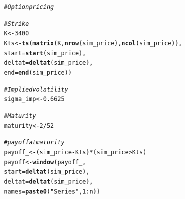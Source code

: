 \documentclass[a4paper]{article}\usepackage[]{graphicx}\usepackage[]{color}
\makeatletter
\newcommand{\hlnum}[1]{\textcolor[rgb]{0.686,0.059,0.569}{#1}}%
\newcommand{\hlstr}[1]{\textcolor[rgb]{0.192,0.494,0.8}{#1}}%
\newcommand{\hlcom}[1]{\textcolor[rgb]{0.678,0.584,0.686}{\textit{#1}}}%
\newcommand{\hlopt}[1]{\textcolor[rgb]{0,0,0}{#1}}%
\newcommand{\hlstd}[1]{\textcolor[rgb]{0.345,0.345,0.345}{#1}}%
\newcommand{\hlkwb}[1]{\textcolor[rgb]{0.69,0.353,0.396}{#1}}%
\newcommand{\hlkwc}[1]{\textcolor[rgb]{0.333,0.667,0.333}{#1}}%
\newcommand{\hlkwd}[1]{\textcolor[rgb]{0.737,0.353,0.396}{\textbf{#1}}}%
\newenvironment{kframe}{%
 \def\at@end@of@kframe{}%
 \ifinner\ifhmode%
  \def\at@end@of@kframe{\end{minipage}}%
  \begin{minipage}{\columnwidth}%
 \fi\fi%
 \def\FrameCommand##1{\hskip\@totalleftmargin \hskip-\fboxsep
 \colorbox{shadecolor}{##1}\hskip-\fboxsep
     \hskip-\linewidth \hskip-\@totalleftmargin \hskip\columnwidth}%
 \MakeFramed {\advance\hsize-\width
   \@totalleftmargin\z@ \linewidth\hsize
   \@setminipage}}%
 {\par\unskip\endMakeFramed%
 \at@end@of@kframe}
\newenvironment{knitrout}{}{} %
\makeatother
\begin{document}
\begin{knitrout}
\color{fgcolor}\begin{kframe}
\begin{alltt}
\hlcom{# Option pricing}

\hlcom{# Strike}
\hlstd{K} \hlkwb{<-} \hlnum{3400}
\hlstd{Kts} \hlkwb{<-} \hlkwd{ts}\hlstd{(}\hlkwd{matrix}\hlstd{(K,} \hlkwd{nrow}\hlstd{(sim_price),} \hlkwd{ncol}\hlstd{(sim_price)),}
               \hlkwc{start} \hlstd{=} \hlkwd{start}\hlstd{(sim_price),}
          \hlkwc{deltat} \hlstd{=} \hlkwd{deltat}\hlstd{(sim_price),}
          \hlkwc{end} \hlstd{=} \hlkwd{end}\hlstd{(sim_price))}

\hlcom{# Implied volatility}
\hlstd{sigma_imp} \hlkwb{<-} \hlnum{0.6625}

\hlcom{#Maturity}
\hlstd{maturity} \hlkwb{<-} \hlnum{2}\hlopt{/}\hlnum{52}

\hlcom{# payoff at maturity}
\hlstd{payoff_} \hlkwb{<-} \hlstd{(sim_price} \hlopt{-} \hlstd{Kts)}\hlopt{*}\hlstd{(sim_price} \hlopt{>} \hlstd{Kts)}
\hlstd{payoff} \hlkwb{<-} \hlkwd{window}\hlstd{(payoff_,}
             \hlkwc{start} \hlstd{=} \hlkwd{deltat}\hlstd{(sim_price),}
             \hlkwc{deltat} \hlstd{=} \hlkwd{deltat}\hlstd{(sim_price),}
             \hlkwc{names} \hlstd{=} \hlkwd{paste0}\hlstd{(}\hlstr{"Series "}\hlstd{,} \hlnum{1}\hlopt{:}\hlstd{n))}


\end{alltt}
\end{kframe}
\end{knitrout}
\end{document}

